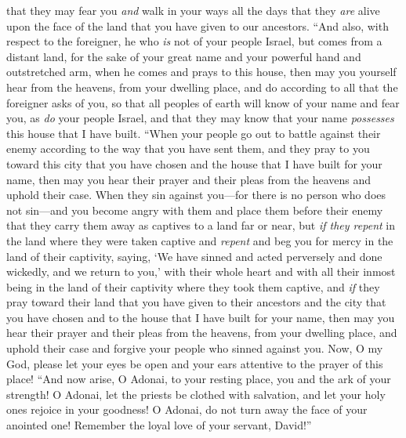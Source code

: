 \begin{biblechapter}
\verse that they may fear you \textit{and} walk in your ways all the days that they \textit{are} alive upon the face of the land that you have given to our ancestors.
\verse “And also, with respect to the foreigner, he who \textit{is} not of your people Israel, but comes from a distant land, for the sake of your great name and your powerful hand and outstretched arm, when he comes and prays to this house,
\verse then may you yourself hear from the heavens, from your dwelling place, and do according to all that the foreigner asks of you, so that all peoples of earth will know of your name and fear you, as \textit{do} your people Israel, and that they may know that your name \textit{possesses} this house that I have built.
\verse “When your people go out to battle against their enemy according to the way that you have sent them, and they pray to you toward this city that you have chosen and the house that I have built for your name,
\verse then may you hear their prayer and their pleas from the heavens and uphold their case.
\verse When they sin against you—for there is no person who does not sin—and you become angry with them and place them before their enemy that they carry them away as captives to a land far or near,
\verse but \textit{if they repent} in the land where they were taken captive and \textit{repent} and beg you for mercy in the land of their captivity, saying, ‘We have sinned and acted perversely and done wickedly,
\verse and we return to you,’ with their whole heart and with all their inmost being in the land of their captivity where they took them captive, and \textit{if} they pray toward their land that you have given to their ancestors and the city that you have chosen and to the house that I have built for your name,
\verse then may you hear their prayer and their pleas from the heavens, from your dwelling place, and uphold their case and forgive your people who sinned against you.
\verse Now, O my God, please let your eyes be open and your ears attentive to the prayer of this place!
\verse “And now arise, O Adonai, to your resting place, you and the ark of your strength! O Adonai, let the priests be clothed with salvation, and let your holy ones rejoice in your goodness!
\verse O Adonai, do not turn away the face of your anointed one! Remember the loyal love of your servant, David!”
\end{biblechapter}

